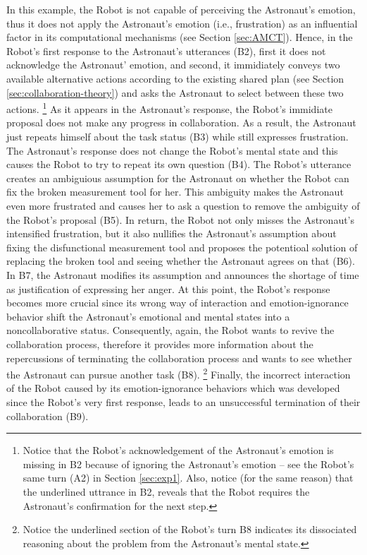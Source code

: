 In this example, the Robot is not capable of perceiving the Astronaut's emotion,
thus it does not apply the Astronaut's emotion (i.e., frustration) as an
influential factor in its computational mechanisms (see Section \ref{sec:AMCT}).
Hence, in the Robot's first response to the Astronaut's utterances (B2), first
it does not acknowledge the Astronaut' emotion, and second, it immidiately
conveys two available alternative actions according to the existing shared plan
(see Section \ref{sec:collaboration-theory}) and asks the Astronaut to select
between these two actions. \footnote{Notice that the Robot's acknowledgement of
the Astronaut's emotion is missing in B2 because of ignoring the Astronaut's
emotion -- see the Robot's same turn (A2) in Section \ref{sec:exp1}. Also,
notice (for the same reason) that the underlined uttrance in B2, reveals that
the Robot requires the Astronaut's confirmation for the next step.} As it
appears in the Astronaut's response, the Robot's immidiate proposal does not
make any progress in collaboration. As a result, the Astronaut just repeats
himself about the task status (B3) while still expresses frustration. The
Astronaut's response does not change the Robot's mental state and this causes
the Robot to try to repeat its own question (B4). The Robot's utterance creates
an ambiguious assumption for the Astronaut on whether the Robot can fix the
broken measurement tool for her. This ambiguity makes the Astronaut even more
frustrated and causes her to ask a question to remove the ambiguity of the
Robot's proposal (B5). In return, the Robot not only misses the Astronaut's
intensified frustration, but it also nullifies the Astronaut's assumption about
fixing the disfunctional measurement tool and proposes the potentioal solution
of replacing the broken tool and seeing whether the Astronaut agrees on that
(B6). In B7, the Astronaut modifies its assumption and announces the shortage of
time as justification of expressing her anger. At this point, the Robot's
response becomes more crucial since its wrong way of interaction and
emotion-ignorance behavior shift the Astronaut's emotional and mental states
into a noncollaborative status. Consequently, again, the Robot wants to revive
the collaboration process, therefore it provides more information about the
repercussions of terminating the collaboration process and wants to see whether
the Astronaut can pursue another task (B8). \footnote{Notice the underlined
section of the Robot's turn B8 indicates its dissociated reasoning about the
problem from the Astronaut's mental state.} Finally, the incorrect interaction
of the Robot caused by its emotion-ignorance behaviors which was developed since
the Robot's very first response, leads to an unsuccessful termination of their
collaboration (B9).\\

